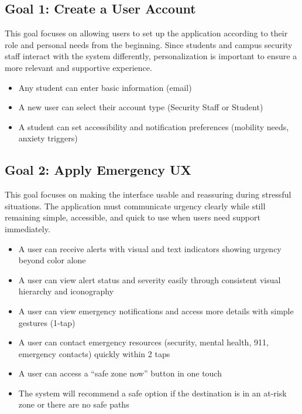 \documentclass[sigconf]{acmart}
\begin{document}
\subsection{Goal 1: Create a User Account}
This goal focuses on allowing users to set up the application according to their role and personal needs from the beginning. Since students and campus security staff interact with the system differently, personalization is important to ensure a more relevant and supportive experience.
 
\begin{itemize}[leftmargin=*, labelindent=0pt, itemsep=2pt]
    \item Any student can enter basic information (email)
    \item A new user can select their account type (Security Staff or Student)
    \item A student can set accessibility and notification preferences (mobility needs, anxiety triggers)
\end{itemize}
 
\subsection{Goal 2: Apply Emergency UX}
This goal focuses on making the interface usable and reassuring during stressful situations. The application must communicate urgency clearly while still remaining simple, accessible, and quick to use when users need support immediately.
 
\begin{itemize}[leftmargin=*, labelindent=0pt, itemsep=2pt]
    \item A user can receive alerts with visual and text indicators showing urgency beyond color alone
    \item A user can view alert status and severity easily through consistent visual hierarchy and iconography
    \item A user can view emergency notifications and access more details with simple gestures (1-tap)
    \item A user can contact emergency resources (security, mental health, 911, emergency contacts) quickly within 2 taps
    \item A user can access a ``safe zone now'' button in one touch
    \item The system will recommend a safe option if the destination is in an at-risk zone or there are no safe paths
\end{itemize}
 
\end{document}

